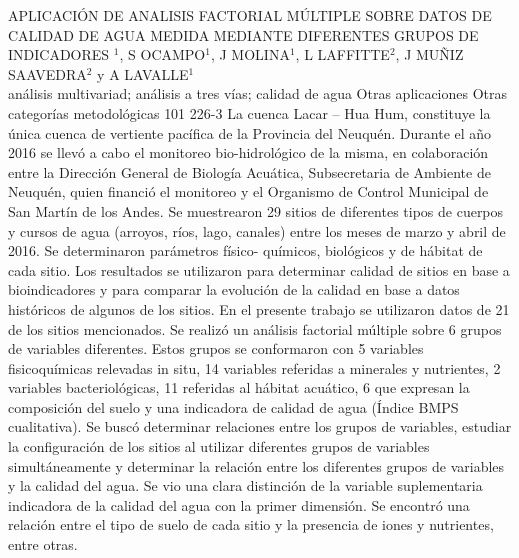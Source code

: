 \A
{APLICACIÓN DE ANALISIS FACTORIAL MÚLTIPLE SOBRE DATOS DE CALIDAD DE AGUA MEDIDA MEDIANTE DIFERENTES GRUPOS DE INDICADORES}
{$^1$, S OCAMPO$^1$, J MOLINA$^1$, L LAFFITTE$^2$, J MUÑIZ SAAVEDRA$^2$ y A LAVALLE$^1$}
{
\\}
{análisis multivariad; análisis a tres vías; calidad de agua} 
 {Otras aplicaciones} 
 {Otras categorías metodológicas} 
 {101} 
 {226-3}
{La cuenca Lacar – Hua Hum, constituye la única cuenca de vertiente pacífica de la Provincia del Neuquén. Durante el año 2016 se llevó a cabo el monitoreo bio-hidrológico de la misma, en colaboración entre la Dirección General de Biología Acuática, Subsecretaria de Ambiente de Neuquén, quien financió el monitoreo y el Organismo de Control Municipal de San Martín de los Andes. Se muestrearon 29 sitios de diferentes tipos de cuerpos y cursos de agua (arroyos, ríos, lago, canales) entre los meses de marzo y abril de 2016. Se determinaron parámetros físico- químicos, biológicos y de hábitat de cada sitio. Los resultados se utilizaron para determinar calidad de sitios en base a bioindicadores y para comparar la evolución de la calidad en base a datos históricos de algunos de los sitios. En el presente trabajo se utilizaron datos de 21 de los sitios mencionados. Se realizó un análisis factorial múltiple sobre 6 grupos de variables diferentes. Estos grupos se conformaron con 5 variables fisicoquímicas relevadas in situ, 14 variables referidas a minerales y nutrientes, 2 variables bacteriológicas, 11 referidas al hábitat acuático, 6 que expresan la composición del suelo y una indicadora de calidad de agua (Índice BMPS cualitativa). Se buscó determinar relaciones entre los grupos de variables, estudiar la configuración de los sitios al utilizar diferentes grupos de variables simultáneamente y determinar la relación entre los diferentes grupos de variables y la calidad del agua. Se vio una clara distinción de la variable suplementaria indicadora de la calidad del agua con la primer dimensión. Se encontró una relación entre el tipo de suelo de cada sitio y la presencia de iones y nutrientes, entre otras.}
